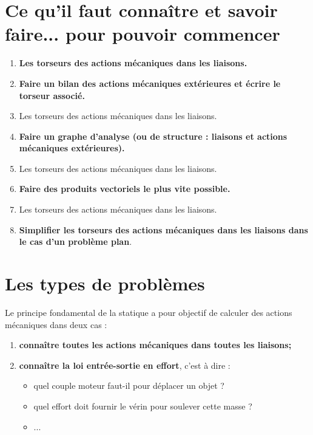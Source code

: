 %
%



\setcounter{section}{0}
\section{Ce qu'il faut connaître et savoir faire... pour pouvoir commencer}
\begin{enumerate}
\item \textbf{Les torseurs des actions mécaniques dans les liaisons.}
\item \textbf{Faire un bilan des actions mécaniques extérieures et écrire le torseur associé.}
\item Les torseurs des actions mécaniques dans les liaisons.
\item \textbf{Faire un graphe d'analyse (ou de structure : liaisons et actions mécaniques extérieures).}
\item Les torseurs des actions mécaniques dans les liaisons.
\item \textbf{Faire des produits vectoriels le plus vite possible.}
\item Les torseurs des actions mécaniques dans les liaisons.
\item \textbf{Simplifier les torseurs des actions mécaniques dans les liaisons dans le cas d'un problème plan}.
\end{enumerate}



\section{Les types de problèmes}

Le principe fondamental de la statique a pour objectif de calculer des actions mécaniques dans deux cas :
\begin{enumerate}
\item \textbf{connaître toutes les actions mécaniques dans toutes les liaisons;}
\item \textbf{connaître la loi entrée-sortie en effort}, c'est à dire :
\begin{itemize}
\item quel couple moteur faut-il pour déplacer un objet ?
\item quel effort doit fournir le vérin pour soulever cette masse ?
\item ...
\end{itemize}
\end{enumerate}

